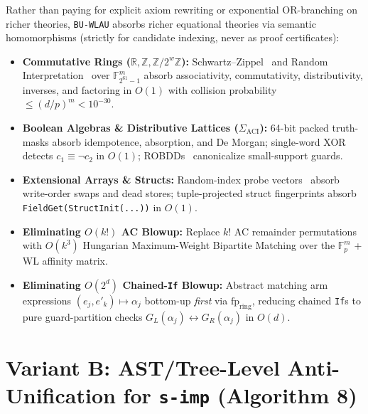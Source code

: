 \documentclass[11pt,a4paper]{article}
\begin{document}
Rather than paying for explicit axiom rewriting or exponential OR-branching on richer theories, \texttt{BU-WLAU} absorbs richer equational theories via semantic homomorphisms (strictly for candidate indexing, never as proof certificates):
\begin{itemize}
  \item \textbf{Commutative Rings ($\mathbb{R}, \mathbb{Z}, \mathbb{Z}/2^w\mathbb{Z}$):} Schwartz--Zippel~\cite{schwartz1980} and Random Interpretation~\cite{gulwani2003} over $\mathbb{F}_{2^{61}-1}^m$ absorb associativity, commutativity, distributivity, inverses, and factoring in $O(1)$ with collision probability $\le (d/p)^m < 10^{-30}$.
  \item \textbf{Boolean Algebras \& Distributive Lattices ($\Sigma_{\text{ACI}}$):} 64-bit packed truth-masks absorb idempotence, absorption, and De Morgan; single-word XOR detects $c_1 \equiv \neg c_2$ in $O(1)$; ROBDDs~\cite{bryant1986} canonicalize small-support guards.
  \item \textbf{Extensional Arrays \& Structs:} Random-index probe vectors~\cite{demoura2009} absorb write-order swaps and dead stores; tuple-projected struct fingerprints absorb \texttt{FieldGet(StructInit(...))} in $O(1)$.
  \item \textbf{Eliminating $O(k!)$ AC Blowup:} Replace $k!$ AC remainder permutations with $O(k^3)$ Hungarian Maximum-Weight Bipartite Matching over the $\mathbb{F}_p^m$ + WL affinity matrix.
  \item \textbf{Eliminating $O(2^d)$ Chained-\texttt{If} Blowup:} Abstract matching arm expressions $(e_j, e'_k) \mapsto \alpha_j$ bottom-up \emph{first} via $\mathrm{fp}_{\text{ring}}$, reducing chained \texttt{If}s to pure guard-partition checks $G_L(\alpha_j) \leftrightarrow G_R(\alpha_j)$ in $O(d)$.
\end{itemize}

\section{Variant B: AST/Tree-Level Anti-Unification for \texttt{s-imp} (Algorithm 8)}
\label{sec:variantb}
\end{document}
